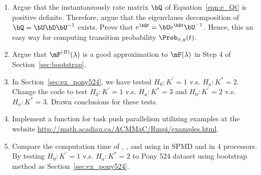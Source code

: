 \begin{enumerate}[label=\thechapter-\arabic*]

\item
Argue that the instantaneously rate matrix $\bQ$ of Equation~\ref{eqn:e_Qt}
is positive definite. Therefore, argue that the
eigenvlaues decomposition
of $\bQ = \bU\bD\bU^{-1}$ exists. Prove that
$e^{\bQ t} = \bU e^{\bD t} \bU^{-1}$. Hence, this an easy way for
computing transition probability $\Prob_{x,y}(t)$.

\item
Argue that $\mF^{(B)}(\lambda)$ is a good approximation to $\mF(\lambda)$
in Step 4 of Section~\ref{sec:bootstrap}.

\item
In Section~\ref{sec:ex_pony524}, we have tested
$H_0: K^\prime = 1$ v.s. $H_a: K^* = 2$.
Change the code to test $H_0: K^\prime = 1$ v.s. $H_a: K^* = 3$ and
$H_0: K^\prime = 2$ v.s. $H_a: K^* = 3$. Drawn conclusions for these tests.

\item
Implement a function  for task push parallelism utilizing
examples at the website
\href{http://math.acadiau.ca/ACMMaC/Rmpi/examples.html}{
http://math.acadiau.ca/ACMMaC/Rmpi/examples.html}.

\item
Compare the computation time of , , and
 using in SPMD and in $4$ processors.
By testing $H_0: K^\prime = 1$ v.s. $H_a: K^* = 2$
to Pony 524 dataset using bootstrap method
as Section~\ref{sec:ex_pony524}.

\end{enumerate}

